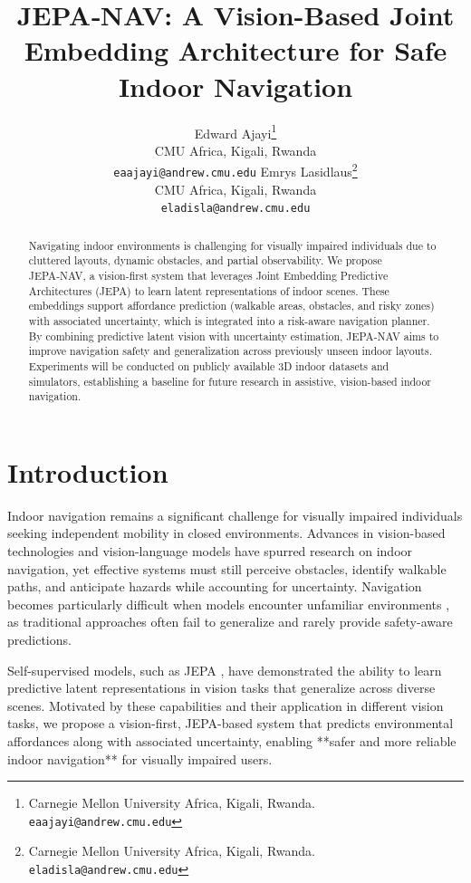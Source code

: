 \documentclass{article}
\title{JEPA‑NAV: A Vision-Based Joint Embedding Architecture for Safe Indoor Navigation}
\author{
Edward Ajayi\thanks{Carnegie Mellon University Africa, Kigali, Rwanda. \texttt{eaajayi@andrew.cmu.edu}} \\
CMU Africa, Kigali, Rwanda \\
\texttt{eaajayi@andrew.cmu.edu}
\And
Emrys Lasidlaus\thanks{Carnegie Mellon University Africa, Kigali, Rwanda. \texttt{eladisla@andrew.cmu.edu}} \\
CMU Africa, Kigali, Rwanda \\
\texttt{eladisla@andrew.cmu.edu}
}
\begin{document}
\maketitle


\begin{abstract}
  Navigating indoor environments is challenging for visually impaired individuals due to cluttered layouts, dynamic obstacles, and partial observability. We propose JEPA‑NAV, a vision-first system that leverages Joint Embedding Predictive Architectures (JEPA) to learn latent representations of indoor scenes. These embeddings support affordance prediction (walkable areas, obstacles, and risky zones) with associated uncertainty, which is integrated into a risk-aware navigation planner. By combining predictive latent vision with uncertainty estimation, JEPA‑NAV aims to improve navigation safety and generalization across previously unseen indoor layouts. Experiments will be conducted on publicly available 3D indoor datasets and simulators, establishing a baseline for future research in assistive, vision-based indoor navigation.
\end{abstract}


\section{Introduction}

Indoor navigation remains a significant challenge for visually impaired individuals seeking independent mobility in closed environments. Advances in vision-based technologies and vision-language models have spurred research on indoor navigation, yet effective systems must still perceive obstacles, identify walkable paths, and anticipate hazards while accounting for uncertainty. Navigation becomes particularly difficult when models encounter unfamiliar environments \cite{najjar2022dynamic}, as traditional approaches often fail to generalize and rarely provide safety-aware predictions.  

Self-supervised models, such as JEPA \cite{assran2025v}, have demonstrated the ability to learn predictive latent representations in vision tasks that generalize across diverse scenes. Motivated by these capabilities and their application in different vision tasks, we propose a vision-first, JEPA-based system that predicts environmental affordances along with associated uncertainty, enabling **safer and more reliable indoor navigation** for visually impaired users.


\end{document}
